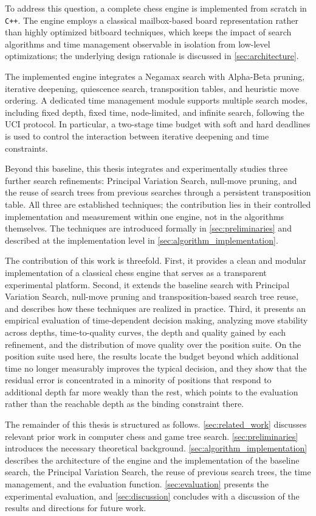 To address this question, a complete chess engine is implemented from scratch in
\texttt{C++}. The engine employs a classical mailbox-based board representation
rather than highly optimized bitboard techniques, which keeps the impact of
search algorithms and time management observable in isolation from low-level
optimizations; the underlying design rationale is discussed in
\cref{sec:architecture}.

The implemented engine integrates a Negamax search with Alpha-Beta pruning,
iterative deepening, quiescence search, transposition tables, and heuristic move
ordering. A dedicated time management module supports multiple search modes,
including fixed depth, fixed time, node-limited, and infinite search, following
the UCI protocol. In particular, a two-stage time budget with soft and hard
deadlines is used to control the interaction between iterative deepening and
time constraints.

Beyond this baseline, this thesis integrates and experimentally studies three
further search refinements: Principal Variation Search, null-move pruning, and the
reuse of search trees from previous searches through a persistent transposition
table. All three are established techniques; the contribution lies in their
controlled implementation and measurement within one engine, not in the
algorithms themselves. The techniques are
introduced formally in \cref{sec:preliminaries} and described at the
implementation level in \cref{sec:algorithm_implementation}.

The contribution of this work is threefold. First, it provides a clean and
modular implementation of a classical chess engine that serves as a transparent
experimental platform. Second, it extends the baseline search with Principal
Variation Search, null-move pruning and transposition-based search tree reuse,
and describes how these techniques are realized in practice. Third, it presents
an empirical evaluation of time-dependent decision making, analyzing move
stability across depths, time-to-quality curves, the depth and quality gained by
each refinement, and the distribution of move quality over the position suite.
On the position suite used here, the results locate the budget beyond which
additional time no longer measurably improves the typical decision, and they show
that the residual error is concentrated in a minority of positions that respond
to additional depth far more weakly than the rest, which points to the evaluation
rather than the reachable depth as the binding constraint there.

The remainder of this thesis is structured as follows. \cref{sec:related_work}
discusses relevant prior work in computer chess and game tree search.
\cref{sec:preliminaries} introduces the necessary theoretical background.
\cref{sec:algorithm_implementation} describes the architecture of the engine and
the implementation of the baseline search, the Principal Variation Search, the
reuse of previous search trees, the time management, and the evaluation
function. \cref{sec:evaluation} presents the experimental evaluation, and
\cref{sec:discussion} concludes with a discussion of the results and directions
for future work.